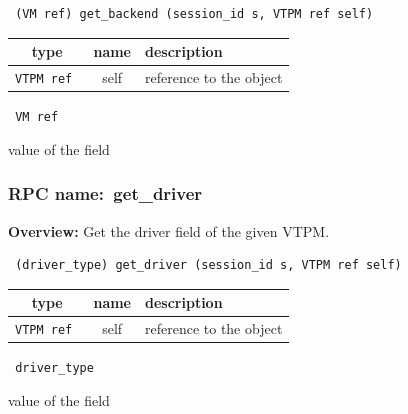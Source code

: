 \begin{verbatim} (VM ref) get_backend (session_id s, VTPM ref self)\end{verbatim}



 
\vspace{0.3cm}
\begin{tabular}{|c|c|p{7cm}|}
 \hline
{\bf type} & {\bf name} & {\bf description} \\ \hline
{\tt VTPM ref } & self & reference to the object \\ \hline 

\end{tabular}

\vspace{0.3cm}

{\tt 
VM ref
}


value of the field
\vspace{0.3cm}
\vspace{0.3cm}
\vspace{0.3cm}
\subsubsection{RPC name:~get\_driver}

{\bf Overview:} 
Get the driver field of the given VTPM.

\begin{verbatim} (driver_type) get_driver (session_id s, VTPM ref self)\end{verbatim}



 
\vspace{0.3cm}
\begin{tabular}{|c|c|p{7cm}|}
 \hline
{\bf type} & {\bf name} & {\bf description} \\ \hline
{\tt VTPM ref } & self & reference to the object \\ \hline 

\end{tabular}

\vspace{0.3cm}

{\tt 
driver\_type
}


value of the field
\vspace{0.3cm}
\vspace{0.3cm}
\vspace{0.3cm}
